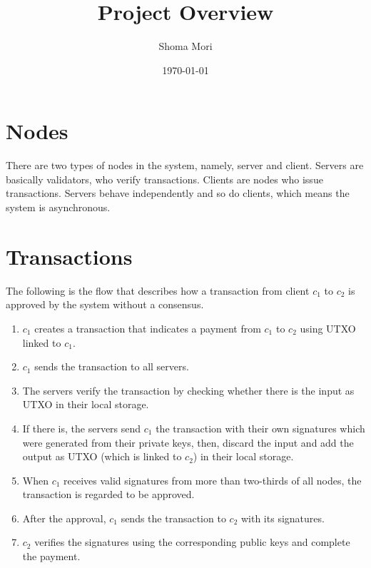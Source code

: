 \documentclass[a4j,10.5pt,uplatex,twocolumn]{article}
\title{Project Overview}
\author{Shoma Mori}
\date{\today}
\begin{document}
\maketitle

\section{Nodes}
There are two types of nodes in the system, namely, server and client.
Servers are basically validators, who verify transactions.
Clients are nodes who issue transactions.
Servers behave independently and so do clients, which means the system is asynchronous.

\section{Transactions}
The following is the flow that describes how a transaction from client $c_1$ to $c_2$ is approved by the system without a consensus.

\begin{enumerate}
    \item $c_1$ creates a transaction that indicates a payment from $c_1$ to $c_2$ using UTXO linked to $c_1$.
    \item $c_1$ sends the transaction to all servers.
    \item The servers verify the transaction by checking whether there is the input as UTXO in their local storage.
    \item If there is, the servers send $c_1$ the transaction with their own signatures which were generated from their private keys, then, discard the input and add the output as UTXO (which is linked to $c_2$) in their local storage.
    \item When $c_1$ receives valid signatures from more than two-thirds of all nodes, the transaction is regarded to be approved.
    \item After the approval, $c_1$ sends the transaction to $c_2$ with its signatures.
    \item $c_2$ verifies the signatures using the corresponding public keys and complete the payment.
\end{enumerate}
\end{document}
